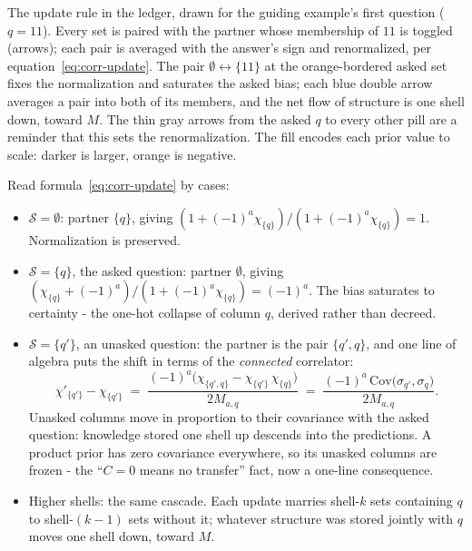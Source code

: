 \documentclass[11pt]{article}
\begin{document}
\begin{example}
\begin{center}
\end{center}
The update rule in the ledger, drawn for the
guiding example's first question ($q = 11$). Every set is paired
with the partner whose membership of $11$ is toggled (arrows);
each pair is averaged with the answer's sign and renormalized,
per equation~\eqref{eq:corr-update}. The pair
$\emptyset \leftrightarrow \{11\}$ at the orange-bordered asked
set fixes the normalization and
saturates the asked bias; each blue double arrow averages a pair
into both of its members, and the net flow of structure is one
shell down, toward $M$. The thin gray arrows from the
asked $q$ to every other pill are a reminder that this sets the
renormalization. The fill encodes each prior value to
scale: darker is larger, orange is negative.
\end{example}

Read formula~\eqref{eq:corr-update} by cases:
\begin{itemize}
  \item $\mathcal S = \emptyset$: partner $\{q\}$, giving
    $(1 + (-1)^a \chi_{\{q\}})/(1 + (-1)^a \chi_{\{q\}}) = 1$.
    Normalization is preserved.
  \item $\mathcal S = \{q\}$, the asked question: partner $\emptyset$, giving
    $(\chi_{\{q\}} + (-1)^a)/(1 + (-1)^a \chi_{\{q\}}) = (-1)^a$.
    The bias saturates to certainty - the one-hot collapse of
    column $q$, derived rather than decreed.
  \item $\mathcal S = \{q'\}$, an unasked question: the partner is the pair
    $\{q', q\}$, and one line of algebra puts the
    shift in terms of the \emph{connected} correlator:
    \begin{equation}\label{eq:cov-shift}
      \chi'_{\{q'\}} - \chi_{\{q'\}}
      \;=\; \frac{(-1)^a \big(\chi_{\{q',q\}}
        - \chi_{\{q'\}}\, \chi_{\{q\}}\big)}{2 M_{a,q}}
      \;=\; \frac{(-1)^a\, \mathrm{Cov}\big(\sigma_{q'}, \sigma_q\big)}
        {2 M_{a,q}}.
    \end{equation}
    Unasked columns move in proportion to their covariance with the
    asked question: knowledge stored one shell up descends into the
    predictions. A product prior has zero covariance everywhere, so
    its unasked columns are frozen - the ``$C = 0$ means no
    transfer'' fact, now a one-line consequence.
  \item Higher shells: the same cascade. Each update marries
    shell-$k$ sets containing $q$ to shell-$(k{-}1)$ sets without
    it; whatever structure was stored jointly with $q$ moves one
    shell down, toward $M$.
\end{itemize}
\end{document}
